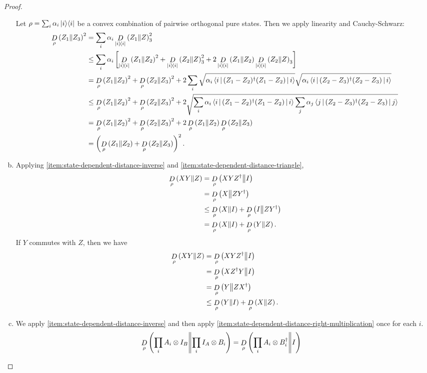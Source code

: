 \begin{proof}
\begin{enumerate}[(a)]
	Let $\rho = \sum_i \a_i\proj i$ be a convex combination of pairwise orthogonal pure states. Then we apply linearity and Cauchy-Schwarz:	
	\begin{align}
		\drho{\rho}{{Z_1}}{Z_3}^2 
		&= \sum_i \a_i \drho{\proj i}{Z_1}Z_3^2
		\\&\leq \sum_i \a_i \left[\drho{\proj i}{Z_1}{Z_2}^2+\drho{\proj i}{Z_2}Z_3^2+2\drho{\proj i}{Z_1}{Z_2}\drho{\proj i}{Z_2}Z_3\right]
		\\&= \drho{\rho}{{Z_1}}{{Z_2}}^2+\drho{\rho}{{Z_2}}{Z_3}^2
		+2\sum_i 
		\sqrt{\a_i\Braket{i|({Z_1}-{Z_2})^\dagger({Z_1}-{Z_2})|i}}
		\sqrt{\a_i\Braket{i|({Z_2}-Z_3)^\dagger({Z_2}-Z_3)|i}}
		\\&\leq \drho{\rho}{{Z_1}}{{Z_2}}^2+\drho{\rho}{{Z_2}}{Z_3}^2
		+2\sqrt{\sum_i \a_i
		\Braket{i|({Z_1}-{Z_2})^\dagger({Z_1}-{Z_2})|i}
		\sum_j\a_j
		\Braket{j|({Z_2}-Z_3)^\dagger({Z_2}-Z_3)|j}}
		\\&= \drho{\rho}{{Z_1}}{{Z_2}}^2+\drho{\rho}{{Z_2}}{Z_3}^2
		+2\drho{\rho}{{Z_1}}{{Z_2}}\drho{\rho}{{Z_2}}{Z_3} 
		\\&= \left(\drho{\rho}{{Z_1}}{{Z_2}} + \drho{\rho}{{Z_2}}{Z_3}\right)^2.
	\end{align}
	\item Applying \eqref{item:state-dependent-distance-inverse} and \eqref{item:state-dependent-distance-triangle},
	\begin{align}
		\drho{\rho}{XY}{Z}
		&= \drho{\rho}{XYZ^\dagger}{I}
		\\&= \drho{\rho}{X}{ZY^\dagger}
		\\&\leq \drho{\rho}{X}{I} + \drho{\rho}{I}{ ZY^\dagger}
		\\&= \drho{\rho}{X}{I} + \drho{\rho}{Y}{ Z}.
	\end{align}
	If $Y$ commutes with $Z$, then we have
	\begin{align}
		\drho{\rho}{XY}{Z}
		&= \drho{\rho}{XYZ^\dagger}{I}
		\\&= \drho{\rho}{XZ^\dagger Y}{I}
		\\&= \drho{\rho}{Y}{ZX^\dagger}
		\\&\leq \drho{\rho}{Y}{I} + \drho{\rho}{X}{ Z}.
	\end{align}
	\item We apply \eqref{item:state-dependent-distance-inverse} and then apply \eqref{item:state-dependent-distance-right-multiplication} once for each $i$.
	\begin{align}
		\drho{\rho}{\prod_{i}A_i\otimes I_B}{\prod_{i}I_A\otimes B_i} 
		&= \drho{\rho}{\prod_{i}A_i\otimes B_i^\dagger}{I}

\end{align}
\end{enumerate}
\end{proof}
